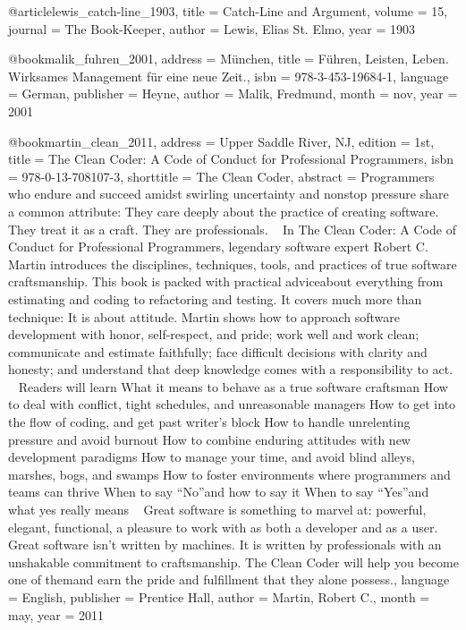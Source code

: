 {@article{lewis_catch-line_1903,
	title = {Catch-{Line} and {Argument}},
	volume = {15},
	journal = {The Book-Keeper},
	author = {Lewis, Elias St. Elmo},
	year = {1903}
}

@book{malik_fuhren_2001,
	address = {M{\"u}nchen},
	title = {F{\"u}hren, {Leisten}, {Leben}. {Wirksames} {Management} f{\"u}r eine neue {Zeit}.},
	isbn = {978-3-453-19684-1},
	language = {German},
	publisher = {Heyne},
	author = {Malik, Fredmund},
	month = nov,
	year = {2001}
}

@book{martin_clean_2011,
	address = {Upper Saddle River, NJ},
	edition = {1st},
	title = {The {Clean} {Coder}: {A} {Code} of {Conduct} for {Professional} {Programmers}},
	isbn = {978-0-13-708107-3},
	shorttitle = {The {Clean} {Coder}},
	abstract = {Programmers who endure and succeed amidst swirling uncertainty and nonstop pressure share a common attribute: They care deeply about the practice of creating software. They treat it as a craft. They are professionals.  ~  In  The Clean Coder: A Code of Conduct for Professional Programmers,  legendary software expert Robert C. Martin introduces the disciplines, techniques, tools, and practices of true software craftsmanship. This book is packed with practical advice{\textendash}about everything from estimating and coding to refactoring and testing. It covers much more than technique: It is about attitude. Martin shows how to approach software development with honor, self-respect, and pride; work well and work clean; communicate and estimate faithfully; face difficult decisions with clarity and honesty; and understand that deep knowledge comes with a responsibility to act.  ~  Readers will learn    What it means to behave as a true software craftsman   How to deal with conflict, tight schedules, and unreasonable managers   How to get into the flow of coding, and get past writer{\textquoteright}s block   How to handle unrelenting pressure and avoid burnout   How to combine enduring attitudes with new development paradigms   How to manage your time, and avoid blind alleys, marshes, bogs, and swamps   How to foster environments where programmers and teams can thrive   When to say {\textquotedblleft}No{\textquotedblright}{\textendash}and how to say it   When to say {\textquotedblleft}Yes{\textquotedblright}{\textendash}and what yes really means   ~  Great software is something to marvel at: powerful, elegant, functional, a pleasure to work with as both a developer and as a user. Great software isn{\textquoteright}t written by machines. It is written by professionals with an unshakable commitment to craftsmanship.  The Clean Coder  will help you become one of them{\textendash}and earn the pride and fulfillment that they alone possess.},
	language = {English},
	publisher = {Prentice Hall},
	author = {Martin, Robert C.},
	month = may,
	year = {2011}
}

}
